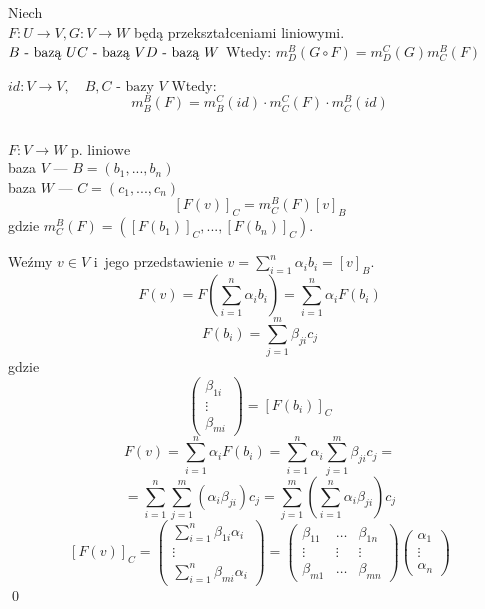 \begin{ft}
    Niech \\ $ F: U \rightarrow V, G: V \rightarrow W $ będą przekształceniami liniowymi.\\
  $ B \text{ - bazą } U\\
    C \text{ - bazą } V\\
    D \text{ - bazą } W\\ $
Wtedy: $m^B_D(G \circ F) = m^C_D(G) m^B_C(F)$
\end{ft}
\begin{wn}
$ id: V \rightarrow V,\quad B, C \text{ - bazy } V$
    Wtedy: $$ m^B_B(F) = m^C_B(id) \cdot m^C_C(F) \cdot m^B_C(id)$$

\begin{tw} 
    ~\\
    $ F: V \rightarrow W \text{ p. liniowe}$ \\
    baza $V$ --- $B=(b_1, ..., b_n)$ \\
    baza $W$ --- $C=(c_1, ..., c_n)$ 
    $$ [F(v) ]_C = m^B_C(F)[v]_B $$ 
    gdzie $m^B_C(F)=([F(b_1)]_C, ..., [F(b_n)]_C)$.
\end{tw}

\begin{dd}
    Weźmy $v \in V$ i~jego przedstawienie $v=\sum\limits_{i=1}^n\alpha_ib_i = [v]_B$.
    \[F(v)=F\left(\sum_{i=1}^n\alpha_ib_i\right)=\sum_{i=1}^n\alpha_iF(b_i)\]
    \[F(b_i)=\sum_{j=1}^m\beta_{ji}c_j\]
    gdzie
    \[\begin{pmatrix}\beta_{1i} \\ \vdots \\ \beta_{mi}\end{pmatrix}=[F(b_i)]_C\]
    \[F(v)=\sum_{i=1}^n\alpha_iF(b_i)=\sum_{i=1}^n\alpha_i\sum_{j=1}^m\beta_{ji}c_j=\]
    \[=\sum_{i=1}^n\sum_{j=1}^m(\alpha_i\beta_{ji})c_j=\sum_{j=1}^m\left(\sum_{i=1}^n\alpha_i\beta_{ji}\right)c_j\]
    \[[F(v)]_C=\begin{pmatrix}\sum\limits_{i=1}^n\beta_{1i}\alpha_i\\ \vdots \\\sum\limits_{i=1}^n\beta_{mi}\alpha_i\end{pmatrix}=
     \begin{pmatrix}\beta_{11}& \dots &\beta_{1n}\\ \vdots & \vdots & \vdots\\\beta_{m1}& \dots&\beta_{mn}\end{pmatrix}
    \begin{pmatrix}\alpha_1\\ \vdots \\\alpha_n\end{pmatrix}  \] \hfill \qed
\end{dd}


\end{wn}
